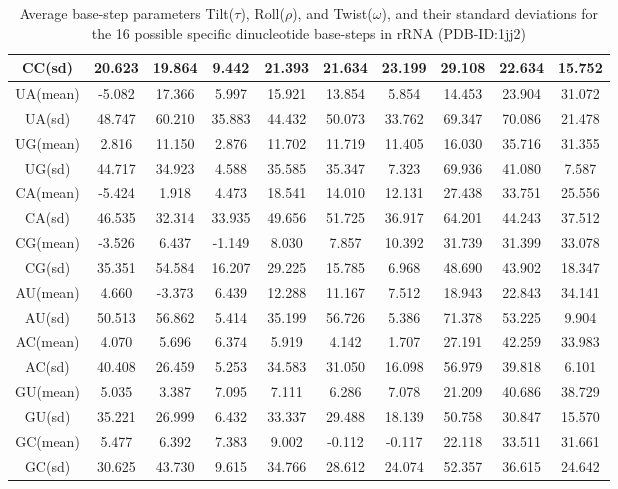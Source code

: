\begin{table}[htbp]
\begin{center}
{\begin{tabular}{|c|c|c|c|c|c|c|c|c|c|}
CC(sd)  & 20.623 & 19.864 & 9.442 & 21.393 & 21.634 & 23.199 & 29.108 & 22.634 & 15.752 \\ \hline
UA(mean) &-5.082 & 17.366 & 5.997 & 15.921 & 13.854 & 5.854 & 14.453 & 23.904 & 31.072 \\ \hline 
UA(sd)  & 48.747 & 60.210 & 35.883 & 44.432 & 50.073 & 33.762 & 69.347 & 70.086 & 21.478 \\ \hline
UG(mean) &2.816 & 11.150 & 2.876 & 11.702 & 11.719 & 11.405 & 16.030 & 35.716 & 31.355 \\ \hline 
UG(sd)  & 44.717 & 34.923 & 4.588 & 35.585 & 35.347 & 7.323 & 69.936 & 41.080 & 7.587 \\ \hline  
CA(mean) &-5.424 & 1.918 & 4.473 & 18.541 & 14.010 & 12.131 & 27.438 & 33.751 & 25.556 \\ \hline 
CA(sd)  & 46.535 & 32.314 & 33.935 & 49.656 & 51.725 & 36.917 & 64.201 & 44.243 & 37.512 \\ \hline
CG(mean) &-3.526 & 6.437 & -1.149 & 8.030 & 7.857 & 10.392 & 31.739 & 31.399 & 33.078 \\ \hline  
CG(sd)  & 35.351 & 54.584 & 16.207 & 29.225 & 15.785 & 6.968 & 48.690 & 43.902 & 18.347 \\ \hline
AU(mean) &4.660 & -3.373 & 6.439 & 12.288 & 11.167 & 7.512 & 18.943 & 22.843 & 34.141 \\ \hline  
AU(sd)  & 50.513 & 56.862 & 5.414 & 35.199 & 56.726 & 5.386 & 71.378 & 53.225 & 9.904 \\ \hline  
AC(mean) &4.070 & 5.696 & 6.374 & 5.919 & 4.142 & 1.707 & 27.191 & 42.259 & 33.983 \\ \hline     
AC(sd)  & 40.408 & 26.459 & 5.253 & 34.583 & 31.050 & 16.098 & 56.979 & 39.818 & 6.101 \\ \hline 
GU(mean) &5.035 & 3.387 & 7.095 & 7.111 & 6.286 & 7.078 & 21.209 & 40.686 & 38.729 \\ \hline     
GU(sd)  & 35.221 & 26.999 & 6.432 & 33.337 & 29.488 & 18.139 & 50.758 & 30.847 & 15.570 \\ \hline
GC(mean) &5.477 & 6.392 & 7.383 & 9.002 & -0.112 & -0.117 & 22.118 & 33.511 & 31.661 \\ \hline   
GC(sd)  & 30.625 & 43.730 & 9.615 & 34.766 & 28.612 & 24.074 & 52.357 & 36.615 & 24.642 \\ \hline
\end{tabular}
}
\caption{Average base-step parameters Tilt($\tau$), Roll($\rho$), and Twist($\omega$), and their standard deviations for the 
16 possible specific dinucleotide base-steps in rRNA (PDB-ID:1jj2)}
\label{tab:average2}
\end{center}
\end{table}


